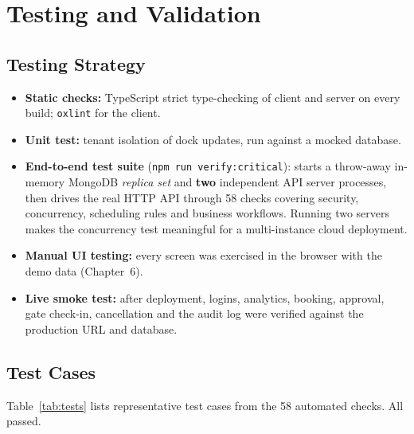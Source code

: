 \chapter{Testing and Validation}

\section{Testing Strategy}
\begin{itemize}
  \item \textbf{Static checks:} TypeScript strict type-checking of client and server on every build; \texttt{oxlint} for the client.
  \item \textbf{Unit test:} tenant isolation of dock updates, run against a mocked database.
  \item \textbf{End-to-end test suite} (\texttt{npm run verify:critical}): starts a throw-away in-memory MongoDB \emph{replica set} and \textbf{two} independent API server processes, then drives the real HTTP API through 58 checks covering security, concurrency, scheduling rules and business workflows. Running two servers makes the concurrency test meaningful for a multi-instance cloud deployment.
  \item \textbf{Manual UI testing:} every screen was exercised in the browser with the demo data (Chapter~6).
  \item \textbf{Live smoke test:} after deployment, logins, analytics, booking, approval, gate check-in, cancellation and the audit log were verified against the production URL and database.
\end{itemize}

\section{Test Cases}
Table~\ref{tab:tests} lists representative test cases from the 58 automated checks. All passed.

